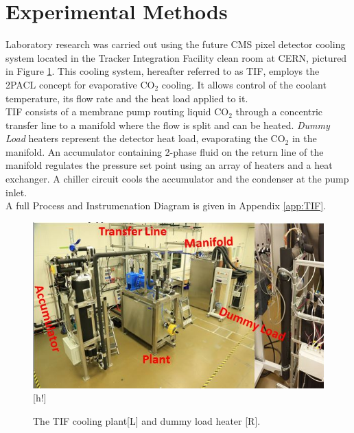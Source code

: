 \documentclass{report}
\begin{document}
\section{Experimental Methods}
\FloatBarrier
Laboratory research was carried out using the future CMS pixel detector cooling system located in the Tracker Integration Facility clean room at CERN, pictured in Figure \ref{fig:TIF}. This cooling system, hereafter referred to as TIF, employs the 2PACL concept for evaporative CO$_2$ cooling. It allows control of the coolant temperature, its flow rate and the heat load applied to  it. \\
TIF consists of a membrane pump routing liquid CO$_2$ through a concentric transfer line to a manifold where the flow is split and can be heated. \textit{Dummy Load} heaters represent the detector heat load, evaporating the CO$_2$ in the manifold. An accumulator containing 2-phase fluid on the return line of the manifold regulates the pressure set point using an array of heaters and a heat exchanger. A chiller circuit cools the accumulator and the condenser at the pump inlet.\\
A full Process and Instrumenation Diagram is given in Appendix \ref{app:TIF}.
\begin{figure}
\includegraphics[width=\textwidth]{TIFandHeater.jpg}[h!]
\caption{The TIF cooling plant[L] and dummy load heater [R]. \cite{tif web}}
\label{fig:TIF}
\end{figure}
\FloatBarrier
\end{document}
